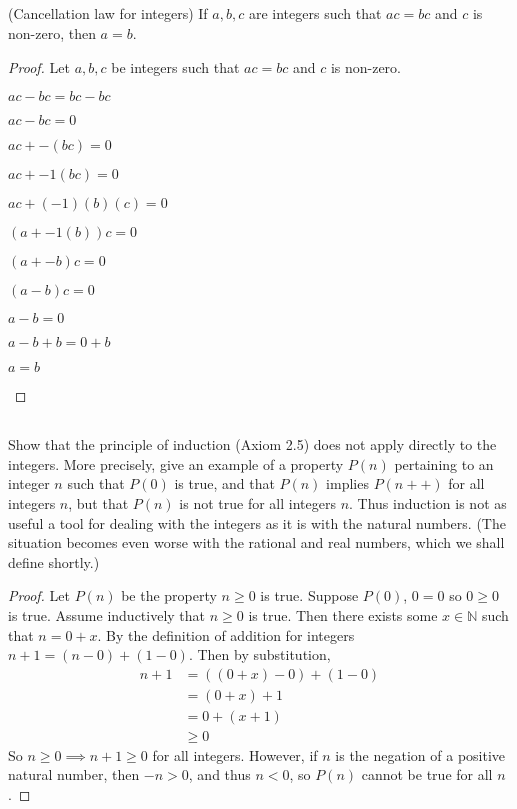 \documentclass[../../main.tex]{subfiles}
\begin{document}
\subsection{}
\begin{q}
    (Cancellation law for integers) If $a, b, c$ are integers such that $ac = bc$ and $c$ is non-zero, then $a = b$.
\end{q}

\begin{proof}
    Let $a, b, c$ be integers such that $ac = bc$ and $c$ is non-zero.
    \begin{linebyline}
        \item $ac - bc = bc - bc$
        \item $ac - bc = 0$
        \item $ac + -(bc) = 0$
        \item $ac + -1(bc) = 0$
        \item $ac + (-1)(b)(c) = 0$
        \item $(a + -1(b))c = 0$
        \item $(a + -b)c = 0$
        \item $(a - b)c=0$
        \item $a-b = 0$ 
        \item $a -b + b = 0 + b$
        \item $a = b$
    \end{linebyline}
\end{proof}

\addtocounter{subsection}{1}
\subsection{}
\begin{q}
    Show that the principle of induction (Axiom 2.5) does not apply directly to the integers. More precisely, give an example of a property $P(n)$ pertaining to an integer $n$ such that $P(0)$ is true, and that $P(n)$ implies $P(n++)$ for all integers $n$, but that $P(n)$ is not true for all integers $n$. Thus induction is not as useful a tool for dealing with the integers as it is with the natural numbers. (The situation becomes even worse with the rational and real numbers, which we shall define shortly.)
\end{q}
\begin{proof}
    Let $P(n)$ be the property $n \geq 0$ is true.
    Suppose $P(0)$, $0=0$ so $0 \geq 0$ is true. 
    Assume inductively that $n \geq 0$ is true. 
    Then there exists some $x \in \mathbb{N}$ such that $n = 0 + x$. 
    By the definition of addition for integers $n+1 = (n - 0) + (1 - 0)$. 
    Then by substitution, 
    \begin{align*}
        n+1 &= ((0 + x) - 0) + (1 - 0) \\
        &= (0 + x) + 1 \\
        &= 0 + (x+1) \\
        & \geq 0
    \end{align*}
    So $n \geq 0 \implies n+1 \geq 0$ for all integers.
    However, if $n$ is the negation of a positive natural number, then $-n > 0$, and thus $n < 0$, so $P(n)$ cannot be true for all $n$.
\end{proof}
\end{document}
